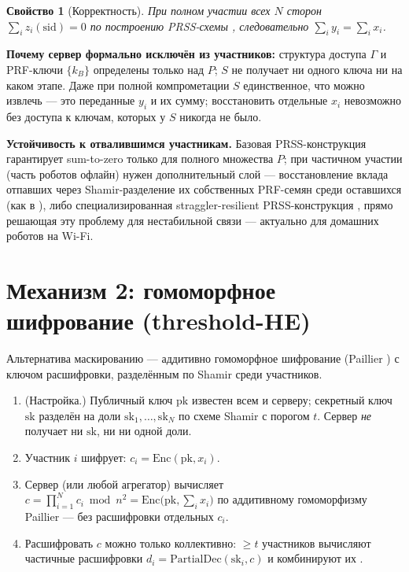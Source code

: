 \documentclass[11pt]{article}
\newtheorem{property}{Свойство}
\begin{document}
\begin{property}[Корректность]
При полном участии всех $N$ сторон $\sum_{i} z_i(\mathrm{sid}) = 0$ по построению
PRSS-схемы \cite{prss2005}, следовательно $\sum_i y_i = \sum_i x_i$.
\end{property}

\textbf{Почему сервер формально исключён из участников:} структура доступа $\Gamma$
и PRF-ключи $\{k_B\}$ определены только над $P$; $S$ не получает ни одного ключа ни
на каком этапе. Даже при полной компрометации $S$ единственное, что можно извлечь —
это переданные $y_i$ и их сумму; восстановить отдельные $x_i$ невозможно без доступа
к ключам, которых у $S$ никогда не было.

\textbf{Устойчивость к отвалившимся участникам.} Базовая PRSS-конструкция
гарантирует sum-to-zero только для полного множества $P$; при частичном участии
(часть роботов офлайн) нужен дополнительный слой — восстановление вклада отпавших
через Shamir-разделение их собственных PRF-семян среди оставшихся (как в
\cite{bonawitzref}), либо специализированная straggler-resilient PRSS-конструкция
\cite{prssstraggler2021}, прямо решающая эту проблему для нестабильной связи —
актуально для домашних роботов на Wi-Fi.

\section{Механизм 2: гомоморфное шифрование (threshold-HE)}

Альтернатива маскированию — аддитивно гомоморфное шифрование (Paillier
\cite{paillier1999}) с ключом расшифровки, разделённым по Shamir среди участников.

\begin{enumerate}
  \item (Настройка.) Публичный ключ $\mathrm{pk}$ известен всем и серверу; секретный
        ключ $\mathrm{sk}$ разделён на доли $\mathrm{sk}_1,\dots,\mathrm{sk}_N$ по
        схеме Shamir с порогом $t$. Сервер \emph{не} получает ни $\mathrm{sk}$, ни
        ни одной доли.
  \item Участник $i$ шифрует: $c_i = \mathrm{Enc}(\mathrm{pk}, x_i)$.
  \item Сервер (или любой агрегатор) вычисляет
        $c = \prod_{i=1}^N c_i \bmod n^2 = \mathrm{Enc}\big(\mathrm{pk}, \textstyle\sum_i x_i\big)$
        по аддитивному гомоморфизму Paillier — без расшифровки отдельных $c_i$.
  \item Расшифровать $c$ можно только коллективно: $\ge t$ участников вычисляют
        частичные расшифровки $d_i = \mathrm{PartialDec}(\mathrm{sk}_i, c)$ и
        комбинируют их \cite{thresholdpaillier}.
\end{enumerate}
\end{document}
